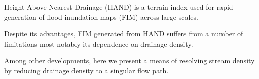 


\begin{keypoints}
\item Height Above Nearest Drainage (HAND) is a terrain index used for rapid generation of flood inundation maps (FIM) across large scales.
\item Despite its advantages, FIM generated from HAND suffers from a number of limitations most notably its dependence on drainage density.
\item Among other developments, here we present a means of resolving stream density by reducing drainage density to a singular flow path. 
\end{keypoints}
